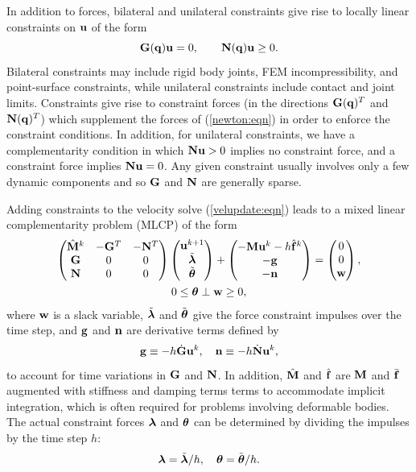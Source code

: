 In addition to forces, bilateral and unilateral constraints give rise to
locally linear constraints on ${\bf u}$ of the form
%
\begin{equation}
{\bf G}({\bf q}) {\bf u} = 0, \qquad {\bf N}({\bf q}) {\bf u} \ge 0.
\label{constraints:eqn}
\end{equation}
%
Bilateral constraints may include rigid body joints, FEM
incompressibility, and point-surface constraints, while unilateral
constraints include contact and joint limits.  Constraints give rise
to constraint forces (in the directions ${\bf G}({\bf q})^T$ and ${\bf N}({\bf q})^T$)
which supplement the forces of (\ref{newton:eqn}) in order to enforce
the constraint conditions.  In addition, for unilateral constraints,
we have a complementarity condition in which ${\bf N} {\bf u} > 0$ implies no
constraint force, and a constraint force implies ${\bf N} {\bf u} = 0$.  Any
given constraint usually involves only a few dynamic components and so
${\bf G}$ and ${\bf N}$ are generally sparse.

Adding constraints to the velocity solve (\ref{velupdate:eqn})
leads to a mixed linear complementarity problem (MLCP)
of the form
\begin{gather}
\left(
\begin{matrix}
\hat{{\bf M}}^{k} & -{\bf G}^{T} & -{\bf N}^{T} \\
{\bf G} & 0 & 0 \\
{\bf N} & 0 & 0 
\end{matrix}
\right)
\left(
\begin{matrix}
{\bf u}^{k+1} \\
\tilde{\boldsymbol\lambda} \\
\tilde{\boldsymbol\theta}
\end{matrix}
\right)
+
\left(
\begin{matrix}
-{\bf M} {\bf u}^{k} - h \hat{{\bf f}}^{k} \\
-{\bf g} \\
-{\bf n}
\end{matrix}
\right)
=
\left(
\begin{matrix}
0 \\
0 \\
{\bf w}
\end{matrix}
\right), \notag \\
0 \le \boldsymbol\theta \perp {\bf w} \ge 0,
\label{KKTvelocity:eqn}
\end{gather}
where ${\bf w}$ is a slack variable, $\tilde{\boldsymbol\lambda}$ and $\tilde{\boldsymbol\theta}$ give the force
constraint impulses over the time step, and ${\bf g}$ and ${\bf n}$ are
derivative terms defined by
%
\begin{equation}
{\bf g} \equiv -h \dot{{\bf G}} {\bf u}^k, \quad {\bf n} \equiv -h \dot{{\bf N}} {\bf u}^k,
\end{equation}
%
to account for time variations in ${\bf G}$ and ${\bf N}$.
In addition,
$\hat{{\bf M}}$ and $\hat{{\bf f}}$ are ${\bf M}$ and $\bar{{\bf f}}$ augmented with stiffness
and damping terms terms to accommodate implicit integration, which
is often required for problems involving deformable bodies.
The actual constraint forces $\boldsymbol\lambda$ and $\boldsymbol\theta$ can be determined
by dividing the impulses by the time step $h$:
%
\begin{equation}
\boldsymbol\lambda = \tilde{\boldsymbol\lambda}/h, \quad \boldsymbol\theta = \tilde{\boldsymbol\theta}/h.
\label{impulsesToForces:eqn}
\end{equation}
%

